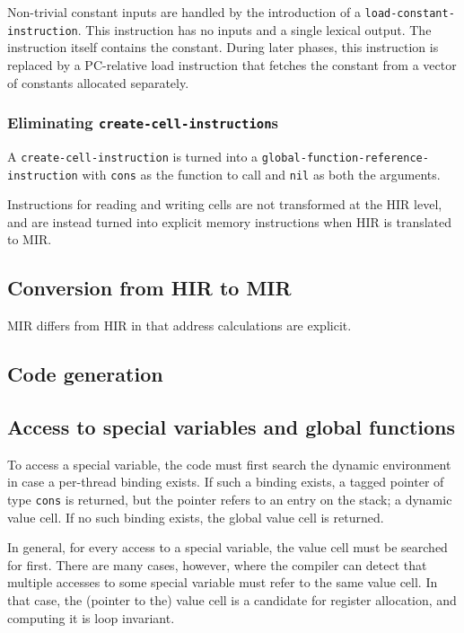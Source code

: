 Non-trivial constant inputs are handled by the introduction of a
\texttt{load-constant-instruction}.  This instruction has no inputs
and a single lexical output.  The instruction itself contains the
constant.  During later phases, this instruction is replaced by a
PC-relative load instruction that fetches the constant from a vector
of constants allocated separately.

\subsubsection{Eliminating \texttt{create-cell-instruction}s}

A \texttt{create-cell-instruction} is turned into a
\texttt{global-function-reference-instruction} with \texttt{cons} as
the function to call and \texttt{nil} as both the arguments.

Instructions for reading and writing cells are not transformed at the
HIR level, and are instead turned into explicit memory instructions
when HIR is translated to MIR.

\subsection{Conversion from HIR to MIR}

MIR differs from HIR in that address calculations are explicit.

\subsection{Code generation}

\subsection{Access to special variables and global functions}

To access a special variable, the code must first search the dynamic
environment in case a per-thread binding exists.  If such a binding
exists, a tagged pointer of type \texttt{cons} is returned, but the
pointer refers to an entry on the stack; a dynamic value cell.  If no
such binding exists, the global value cell is returned.

In general, for every access to a special variable, the value cell
must be searched for first.  There are many cases, however, where the
compiler can detect that multiple accesses to some special variable
must refer to the same value cell.  In that case, the (pointer to the)
value cell is a candidate for register allocation, and computing it is
loop invariant.

